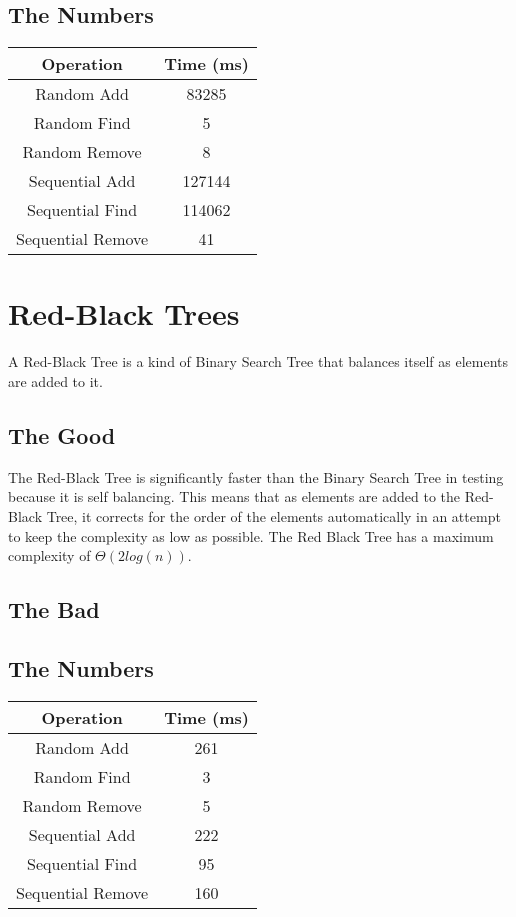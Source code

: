 \documentclass{muformallab}
\begin{document}
  \subsection{The Numbers}

  \begin{center}
    \begin{tabular}{c c}
      Operation & Time (ms) \\
      \hline
      Random Add & 83285 \\
      Random Find & 5 \\
      Random Remove & 8 \\
      Sequential Add & 127144 \\
      Sequential Find & 114062 \\
      Sequential Remove & 41 \\
    \end{tabular}
  \end{center}

  \section{Red-Black Trees}

  A Red-Black Tree is a kind of Binary Search Tree that balances itself as
  elements are added to it.

  \subsection{The Good}

  The Red-Black Tree is significantly faster than the Binary Search Tree
  in testing because it is self balancing. This means that as elements are
  added to the Red-Black Tree, it corrects for the order of the elements
  automatically in an attempt to keep the complexity as low as possible.
  The Red Black Tree has a maximum complexity of $\Theta \left( 2 log
  \left( n \right) \right)$.

  \subsection{The Bad}

  \subsection{The Numbers}

  \begin{center}
    \begin{tabular}{c c}
      Operation & Time (ms) \\
      \hline
      Random Add & 261 \\
      Random Find & 3 \\
      Random Remove & 5 \\
      Sequential Add & 222 \\
      Sequential Find & 95 \\
      Sequential Remove & 160 \\
    \end{tabular}
  \end{center}
\end{document}
